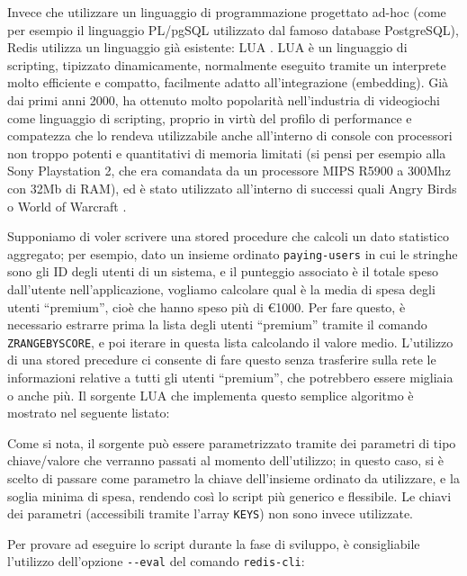 Invece che utilizzare un linguaggio di programmazione progettato ad-hoc (come per esempio il
linguaggio PL/pgSQL \cite{plpgsql} utilizzato dal famoso database PostgreSQL), Redis utilizza un
linguaggio già esistente: LUA \cite{lua}. LUA è un linguaggio di scripting, tipizzato dinamicamente,
normalmente eseguito tramite un interprete molto efficiente e compatto, facilmente adatto
all'integrazione (embedding). Già dai primi anni 2000, ha ottenuto molto popolarità nell'industria
di videogiochi come linguaggio di scripting, proprio in virtù del profilo di performance e
compatezza che lo rendeva utilizzabile anche all'interno di console con processori non troppo
potenti e quantitativi di memoria limitati (si pensi per esempio alla Sony Playstation 2, che era
comandata da un processore MIPS R5900 a 300Mhz con 32Mb di RAM), ed è stato utilizzato all'interno
di successi quali Angry Birds \cite{lua-angry} o World of Warcraft \cite{lua-wow}.

Supponiamo di voler scrivere una stored procedure che calcoli un dato statistico aggregato; per
esempio, dato un insieme ordinato \verb|paying-users| in cui le stringhe sono gli ID degli utenti
di un sistema, e il punteggio associato è il totale speso dall'utente nell'applicazione, vogliamo
calcolare qual è la media di spesa degli utenti ``premium'', cioè che hanno speso più di €1000. 
Per fare questo, è necessario estrarre prima la lista degli utenti ``premium'' tramite il comando
\verb|ZRANGEBYSCORE|, e poi iterare in questa lista calcolando il valore medio. L'utilizzo di una
stored precedure ci consente di fare questo senza trasferire sulla rete le informazioni relative
a tutti gli utenti ``premium'', che potrebbero essere migliaia o anche più. Il sorgente LUA che
implementa questo semplice algoritmo è mostrato nel seguente listato:

\medskip


Come si nota, il sorgente può essere parametrizzato tramite dei parametri di tipo chiave/valore
che verranno passati al momento dell'utilizzo; in questo caso, si è scelto di passare come parametro 
la chiave dell'insieme ordinato da utilizzare, e la soglia minima di spesa, rendendo così lo script 
più generico e flessibile. Le chiavi dei parametri (accessibili tramite l'array \verb|KEYS|) non
sono invece utilizzate.

Per provare ad eseguire lo script durante la fase di sviluppo, è consigliabile l'utilizzo
dell'opzione \verb|--eval| del comando \verb|redis-cli|:

